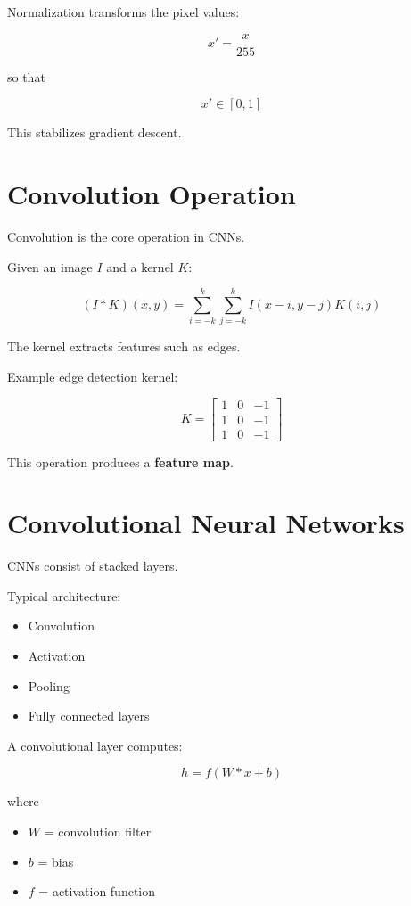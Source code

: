 \documentclass[11pt]{article}
\begin{document}
Normalization transforms the pixel values:

\[
x' = \frac{x}{255}
\]

so that

\[
x' \in [0,1]
\]

This stabilizes gradient descent.

\section{Convolution Operation}

Convolution is the core operation in CNNs.

Given an image $I$ and a kernel $K$:

\[
(I * K)(x,y) = \sum_{i=-k}^{k} \sum_{j=-k}^{k} I(x-i,y-j)K(i,j)
\]

The kernel extracts features such as edges.

Example edge detection kernel:

\[
K =
\begin{bmatrix}
1 & 0 & -1 \\
1 & 0 & -1 \\
1 & 0 & -1
\end{bmatrix}
\]

This operation produces a \textbf{feature map}.

\section{Convolutional Neural Networks}

CNNs consist of stacked layers.

Typical architecture:

\begin{itemize}
\item Convolution
\item Activation
\item Pooling
\item Fully connected layers
\end{itemize}

A convolutional layer computes:

\[
h = f(W * x + b)
\]

where

\begin{itemize}
\item $W$ = convolution filter
\item $b$ = bias
\item $f$ = activation function
\end{itemize}
\end{document}
